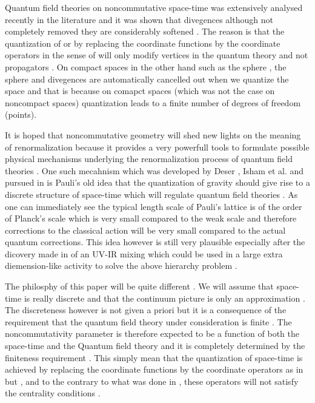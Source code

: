 \documentclass[a4paper,12pt]{article}
\begin{document}
Quantum field theories on noncommutative space-time was
extensively analysed recently in the literature
\cite{seiberg,martin,krajewski,chep,ya,ben,mssw,hayakawa,adi,chms,cdp} and it
was shown that divegences although not completely removed they
are considerably softened . The reason is that the quantization
of \coordHE{} or \coordHE{} by replacing the coordinate functions \coordHE{} by the
coordinate operators \coordHE{} in the sense of \cite{dop} will
only modify vertices in the quantum theory and not propagators .
On compact spaces in the other hand such as the \coordHE{}sphere \coordHE{}
\cite{hcp} , the \coordHE{} sphere \coordHE{} \cite{hcp1} and \coordHE{}
\cite{str} divegences are automatically cancelled out when we
quantize the space and that is because on comapct spaces (which was not the case on noncompact spaces) quantization leads to a finite number of degrees of freedom (points).

It is hoped that noncommutative geometry will shed new lights on
the meaning of renormalization because it provides a very
powerfull tools to formulate possible physical mechanisms
underlying the renormalization process of quantum field theories .
One such mecahnism which was developed by Deser \cite{deser} , Isham
et al.\cite{iss} and pursued in \cite{sorkin,madoregravity} is
Pauli's old idea that the quantization of gravity should give
rise to a discrete structure of space-time which will regulate
quantum field theories . As one can immediately see the typical
length scale of Pauli's lattice is of the order of Planck's scale
\coordHE{} which is very small compared to the weak scale and
therefore corrections to the classical action will be very small
compared to the actual quantum corrections. This idea however is
still very plausible especially after the dicovery made in
\cite{seiberg} of an UV-IR mixing which could be used in a large
extra diemension-like activity to solve the above hierarchy
problem .

The philosphy of this paper will be quite different . We will
assume that space-time is really discrete and that the continuum
picture is only an approximation \cite{sorkin}. The discreteness however is
not given a priori but it is a consequence of the requirement that
the quantum field theory under consideration is finite . The
noncommutativity parameter \myHighlight{${\theta}$}\coordHE{} is therefore expected to be
a function of both the space-time and the Quantum field theory
and it is completely determined by the finiteness requirement .
This simply mean that the quantization of space-time is achieved by
replacing the coordinate functions \coordHE{} by the coordinate
operators \coordHE{} as in \cite{snyder} but , and to the contrary to what was done in \cite{dop} , these operators will not satisfy the centrality
conditions \coordHE{} .
\end{document}
